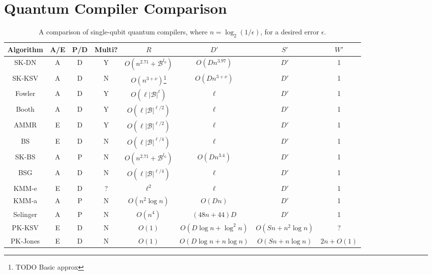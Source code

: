\section{Quantum Compiler Comparison}
\label{sec:qcompile-compare}

\begin{table}[hbt!]
\begin{tabular}{|c|c|c|c|c|c|c|c|}
\hline
Algorithm                  & A/E & P/D & Multi? & $R$                             & $D'$             & $S'$ & $W'$ \\
\hline
SK-DN\cite{Dawson2005}      & A   & D   & Y    & $O(n^{2.71} + \mathcal{B}^{l_0})$                    & $O(D n^{3.97})$  & $D'$ & 1    \\
SK-KSV\cite{Kitaev2002}     & A   & D   & N    & $O(n^{3+\nu})$\footnote{TODO Basic approx}                   & $O(D n^{3+\nu})$ & $D'$ & 1    \\
Fowler\cite{Fowler2011}     & A   & D   & Y    & $O(\ell |\mathcal{B}|^{\ell})$   & $\ell$           & $D'$ & 1    \\
Booth \cite{Booth2012}      & A   & D   & Y    & $O(\ell |\mathcal{B}|^{\ell/2})$ & $\ell$           & $D'$ & 1    \\
AMMR \cite{Amy2012}         & E   & D   & Y    & $O(\ell |\mathcal{B}|^{\ell/2})$ & $\ell$           & $D'$ & 1    \\
BS \cite{Bocharov2012}      & E   & D   & N    & $O(\ell |\mathcal{B}|^{\ell/4})$ & $\ell$           & $D'$ & 1    \\
SK-BS \cite{Bocharov2012}   & A   & P   & N    & $O(n^{2.71} + \mathcal{B}^{l_0})$ & $O(Dn^{3.4})$           & $D'$ & 1    \\
BSG \cite{Bocharov2013}     & A   & D   & N    & $O(\ell |\mathcal{B}|^{\ell/4})$ & $\ell$           & $D'$ & 1    \\
KMM-e\cite{Kliuchnikov2012} & E   & D   & ?    & $\ell^2$                         & $\ell$           & $D'$ & 1    \\
KMM-a\cite{Kliuchnikov2012b}& A   & P   & N    & $O(n^2\log n)$                   & $O(Dn)$          & $D'$ & 1    \\
Selinger\cite{Selinger2012} & A   & P   & N    & $O(n^4)$                         & $(48n + 44)D$    & $D'$ & 1    \\
PK-KSV \cite{Kitaev2002,Cleve2000} & E & D & N & $O(1)$                           & $O(D\log n + \log^2 n)$ & $O(S n + n^2 \log n)$ & ? \\
PK-Jones \cite{Jones2013}   & E  & D   & N     & $O(1)$                           & $O(D\log n + n \log n)$ & $O(S n + n \log n)$ & $2n + O(1)$ \\
\end{tabular}
\caption{A comparison of single-qubit quantum compilers, where $n = \log_2(1/\epsilon)$, for a desired error $\epsilon$.}
\label{tab:qcompile-compare}
\end{table}


